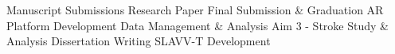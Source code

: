 {\begin{tabularx}{\linewidth}{|l!{\vrule width \myLenLineThicknessThick}*{7}{@{}X@{}|}}
       & 
    
      
      
       & 
    
      
      
       & 
    
      
      
      
        \\  \hline 
      
    
  
  
  \end{tabularx}
}
\vfill{\centering{} \small{Manuscript Submissions}\hspace{1.5em} \small{Research Paper}\hspace{1.5em} \small{Final Submission \& Graduation}\hspace{1.5em} \small{AR Platform Development}\hspace{1.5em} \small{Data Management \& Analysis}\hspace{1.5em} \small{Aim 3 - Stroke Study \& Analysis}\hspace{1.5em} \small{Dissertation Writing}\hspace{1.5em} \small{SLAVV-T Development}\hspace{1.5em}\par}

